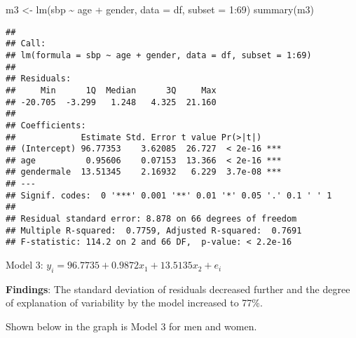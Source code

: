 \documentclass[
]{article}
\newenvironment{Shaded}{\begin{snugshade}}{\end{snugshade}}
\newcommand{\AttributeTok}[1]{\textcolor[rgb]{0.77,0.63,0.00}{#1}}
\newcommand{\DecValTok}[1]{\textcolor[rgb]{0.00,0.00,0.81}{#1}}
\newcommand{\FunctionTok}[1]{\textcolor[rgb]{0.00,0.00,0.00}{#1}}
\newcommand{\NormalTok}[1]{#1}
\newcommand{\OtherTok}[1]{\textcolor[rgb]{0.56,0.35,0.01}{#1}}
\newcommand{\SpecialCharTok}[1]{\textcolor[rgb]{0.00,0.00,0.00}{#1}}
\begin{document}
\begin{Shaded}
\begin{Highlighting}[]
\NormalTok{m3 }\OtherTok{\textless{}{-}} \FunctionTok{lm}\NormalTok{(sbp }\SpecialCharTok{\textasciitilde{}}\NormalTok{ age }\SpecialCharTok{+}\NormalTok{ gender, }\AttributeTok{data =}\NormalTok{ df, }\AttributeTok{subset =} \DecValTok{1}\SpecialCharTok{:}\DecValTok{69}\NormalTok{)}
\FunctionTok{summary}\NormalTok{(m3)}
\end{Highlighting}
\end{Shaded}

\begin{verbatim}
## 
## Call:
## lm(formula = sbp ~ age + gender, data = df, subset = 1:69)
## 
## Residuals:
##     Min      1Q  Median      3Q     Max 
## -20.705  -3.299   1.248   4.325  21.160 
## 
## Coefficients:
##             Estimate Std. Error t value Pr(>|t|)    
## (Intercept) 96.77353    3.62085  26.727  < 2e-16 ***
## age          0.95606    0.07153  13.366  < 2e-16 ***
## gendermale  13.51345    2.16932   6.229  3.7e-08 ***
## ---
## Signif. codes:  0 '***' 0.001 '**' 0.01 '*' 0.05 '.' 0.1 ' ' 1
## 
## Residual standard error: 8.878 on 66 degrees of freedom
## Multiple R-squared:  0.7759, Adjusted R-squared:  0.7691 
## F-statistic: 114.2 on 2 and 66 DF,  p-value: < 2.2e-16
\end{verbatim}

Model 3: \(y_{i} = 96.7735 + 0.9872x_{1} + 13.5135x_{2} + e_{i}\)

\textbf{Findings}: The standard deviation of residuals decreased further
and the degree of explanation of variability by the model increased to
77\%.

Shown below in the graph is Model 3 for men and women.
\end{document}
